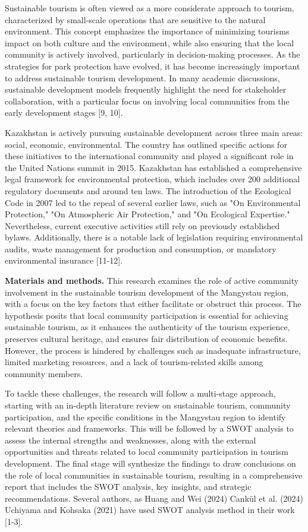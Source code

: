 \begin{multicols}{2}
Sustainable tourism is often viewed as a more considerate approach to
tourism, characterized by small-scale operations that are sensitive to
the natural environment. This concept emphasizes the importance of
minimizing tourism\textquotesingle s impact on both culture and the
environment, while also ensuring that the local community is actively
involved, particularly in decision-making processes. As the strategies
for park protection have evolved, it has become increasingly important
to address sustainable tourism development. In many academic
discussions, sustainable development models frequently highlight the
need for stakeholder collaboration, with a particular focus on involving
local communities from the early development stages {[}9, 10{]}.

Kazakhstan is actively pursuing sustainable development across three
main areas: social, economic, environmental. The country has outlined
specific actions for these initiatives to the international community
and played a significant role in the United Nations summit in 2015.
Kazakhstan has established a comprehensive legal framework for
environmental protection, which includes over 200 additional regulatory
documents and around ten laws. The introduction of the Ecological Code
in 2007 led to the repeal of several earlier laws, such as "On
Environmental Protection," "On Atmospheric Air Protection," and "On
Ecological Expertise." Nevertheless, current executive activities still
rely on previously established bylaws. Additionally, there is a notable
lack of legislation requiring environmental audits, waste management for
production and consumption, or mandatory environmental insurance
{[}11-12{]}.

{\bfseries Materials and methods.} This research examines the role of
active community involvement in the sustainable tourism development of
the Mangystau region, with a focus on the key factors that either
facilitate or obstruct this process. The hypothesis posits that local
community participation is essential for achieving sustainable tourism,
as it enhances the authenticity of the tourism experience, preserves
cultural heritage, and ensures fair distribution of economic benefits.
However, the process is hindered by challenges such as inadequate
infrastructure, limited marketing resources, and a lack of
tourism-related skills among community members.

To tackle these challenges, the research will follow a multi-stage
approach, starting with an in-depth literature review on sustainable
tourism, community participation, and the specific conditions in the
Mangystau region to identify relevant theories and frameworks. This will
be followed by a SWOT analysis to assess the internal strengths and
weaknesses, along with the external opportunities and threats related to
local community participation in tourism development. The final stage
will synthesize the findings to draw conclusions on the role of local
communities in sustainable tourism, resulting in a comprehensive report
that includes the SWOT analysis, key insights, and strategic
recommendations. Several authors, as Huang and Wei (2024) Cankül et al.
(2024) Uchiyama and Kohsaka (2021) have used SWOT analysis method in
their work {[}1-3{]}.


\end{multicols}
